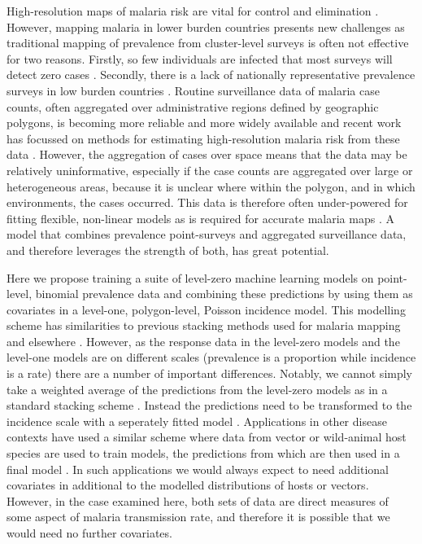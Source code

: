 \documentclass[review]{elsarticle}
\begin{document}
High-resolution maps of malaria risk are vital for control and elimination \citep{weiss2019mapping, battle2019mapping}.
However, mapping malaria in lower burden countries presents new challenges as traditional mapping of prevalence from cluster-level surveys \citep{weiss2019mapping, bhatt2017improved, battle2019mapping, bhatt2015effect} is often not effective for two reasons.
Firstly, so few individuals are infected that most surveys will detect zero cases \citep{sturrock2016mapping}.
Secondly, there is a lack of nationally representative prevalence surveys in low burden countries \citep{sturrock2016mapping, sturrock2014fine}. 
Routine surveillance data of malaria case counts, often aggregated over administrative regions defined by geographic polygons, is becoming more reliable and more widely available \citep{sturrock2016mapping} and recent work has focussed on methods for estimating high-resolution malaria risk from these data \citep{sturrock2014fine, wilson2017pointless, law2018variational, taylor2017continuous, li2012log}. 
However, the aggregation of cases over space means that the data may be relatively uninformative, especially if the case counts are aggregated over large or heterogeneous areas, because it is unclear where within the polygon, and in which environments, the cases occurred. 
This data is therefore often under-powered for fitting flexible, non-linear models as is required for accurate malaria maps \citep{bhatt2017improved, bhatt2015effect}. 
A model that combines prevalence point-surveys and aggregated surveillance data, and therefore leverages the strength of both, has great potential.

Here we propose training a suite of level-zero machine learning models on point-level, binomial prevalence data and combining these predictions by using them as covariates in a level-one, polygon-level, Poisson incidence model.
This modelling scheme has similarities to previous stacking methods used for malaria mapping \citep{bhatt2017improved} and elsewhere \citep{wolpert1992stacked, sill2009feature, hao2019review, breiman1996stacked}.
However, as the response data in the level-zero models and the level-one models are on different scales (prevalence is a proportion while incidence is a rate) there are a number of important differences.
Notably, we cannot simply take a weighted average of the predictions from the level-zero models as in a standard stacking scheme \citep{sill2009feature, hao2019review}.
Instead the predictions  need to be transformed to the incidence scale with a seperately fitted model \citep{cameron2015defining}.
Applications in other disease contexts have used a similar scheme where data from vector or wild-animal host species are used to train models, the predictions from which are then used in a final model \citep{pigott2014mapping, shearer2016estimating}.
In such applications we would always expect to need additional covariates in additional to the modelled distributions of hosts or vectors.
However, in the case examined here, both sets of data are direct measures of some aspect of malaria transmission rate, and therefore it is possible that we would need no further covariates. 
\end{document}
